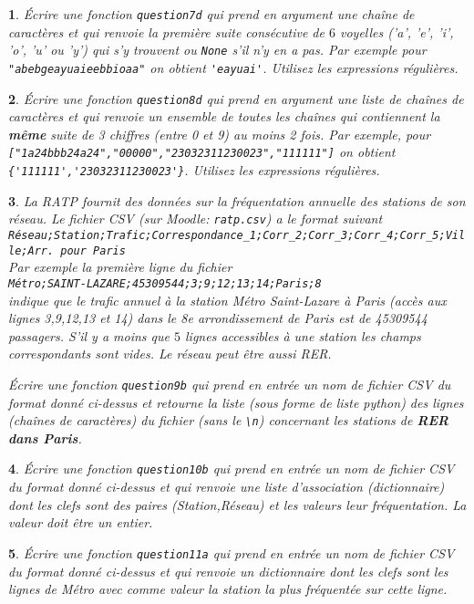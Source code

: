 \documentclass[10pt]{article}
\newtheorem{exi}{}
\newenvironment{exo}{\begin{exi}\em}{\end{exi}}
\begin{document}
\vspace*{-2ex}
\begin{exo}
    Écrire une fonction {\tt question7d}
qui prend en argument une chaîne de caractères et qui renvoie
la première suite consécutive de $6$ voyelles ('a', 'e', 'i', 'o', 'u' ou 'y')
qui s'y trouvent ou \verb+None+
s'il n'y en a pas.
Par exemple pour \verb+"abebgeayuaieebbioaa"+ on obtient
\verb+'eayuai'+. Utilisez les expressions régulières.
\end{exo}
\vspace*{-2ex}
\begin{exo}
    Écrire une fonction {\tt question8d} qui prend en argument une liste
de chaînes de caractères et qui renvoie un ensemble de toutes les chaînes
qui contiennent la {\bf même} suite de 3
chiffres (entre 0 et 9) au moins 2 fois.
Par exemple, pour \verb+["1a24bbb24a24","00000","23032311230023","111111"]+
on obtient \verb+{'111111','23032311230023'}+.
Utilisez les expressions régulières.
\end{exo}
\vspace*{-2ex}
\begin{exo}
    La RATP fournit des données sur la fréquentation annuelle des stations de son
réseau. Le fichier CSV (sur Moodle: \verb+ratp.csv+) a le format suivant\\
\verb+Réseau;Station;Trafic;Correspondance_1;Corr_2;Corr_3;Corr_4;Corr_5;Ville;Arr. pour Paris+\\
Par exemple la première ligne du fichier\\
\verb+Métro;SAINT-LAZARE;45309544;3;9;12;13;14;Paris;8+\\
indique que le trafic annuel à la station Métro Saint-Lazare à Paris (accès aux lignes 3,9,12,13 et 14) dans le 8e arrondissement de Paris est de 45309544 passagers.
S'il y a moins que $5$ lignes accessibles à une station les champs correspondants sont vides. Le réseau peut être aussi RER.

Écrire une fonction {\tt question9b} qui prend en entrée un nom de fichier CSV
du format donné ci-dessus
et retourne la liste (sous forme de liste python) des lignes (chaînes
de caractères) du fichier (sans le \verb+\n+)
concernant les stations de {\bf RER dans Paris}.
\end{exo}
\vspace*{-2ex}
\begin{exo}
    Écrire une fonction {\tt question10b} qui prend en entrée un nom de fichier CSV
du format donné ci-dessus
et qui renvoie une liste d'association (dictionnaire) dont les clefs sont
des paires (Station,Réseau) et les valeurs leur fréquentation.
La valeur doit être un entier.
\end{exo}
\vspace*{-2ex}
\begin{exo}
    Écrire une fonction {\tt question11a} qui prend en entrée un nom de fichier CSV
du format donné ci-dessus et qui renvoie un dictionnaire dont les clefs sont
les lignes de Métro
avec comme valeur la station la plus fréquentée sur cette ligne.
\end{exo}
\vspace*{-2ex}
\end{document}
